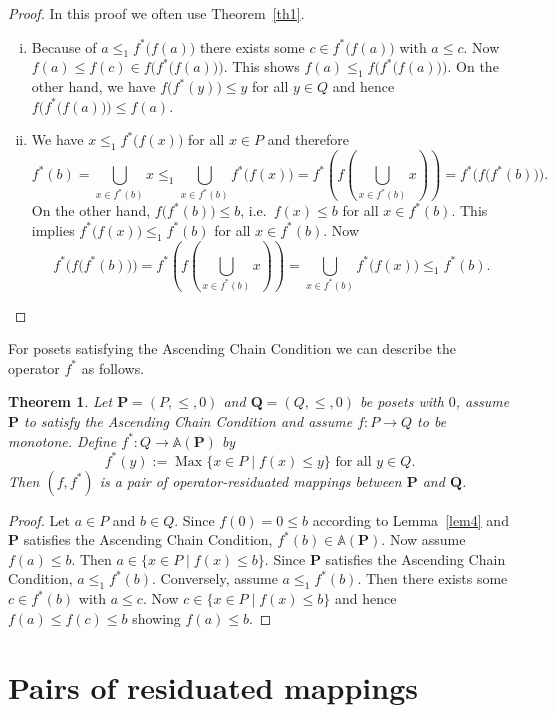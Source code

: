\documentclass[12pt]{article}
\DeclareMathOperator{\Max}{Max}
\newtheorem{theorem}{Theorem}[section]
\begin{document}
\begin{proof}
In this proof we often use Theorem~\ref{th1}.
\begin{enumerate}[(i)]
\item Because of $a\le_1f^*\big(f(a)\big)$ there exists some $c\in f^*\big(f(a)\big)$ with $a\le c$. Now $f(a)\le f(c)\in f\Big(f^*\big(f(a)\big)\Big)$. This shows $f(a)\le_1f\Big(f^*\big(f(a)\big)\Big)$. On the other hand, we have $f\big(f^*(y)\big)\le y$ for all $y\in Q$ and hence $f\Big(f^*\big(f(a)\big)\Big)\le f(a)$.
\item We have $x\le_1f^*\big(f(x)\big)$ for all $x\in P$ and therefore
\[
f^*(b)=\bigcup_{x\in f^*(b)}x\le_1\bigcup_{x\in f^*(b)}f^*\big(f(x)\big)=f^*(f\left(\bigcup_{x\in f^*(b)}x\right))=f^*\Big(f\big(f^*(b)\big)\Big).
\]
On the other hand, $f\big(f^*(b)\big)\le b$, i.e.\ $f(x)\le b$ for all $x\in f^*(b)$. This implies $f^*\big(f(x)\big)\le_1f^*(b)$ for all $x\in f^*(b)$. Now
\[
f^*\Big(f\big(f^*(b)\big)\Big)=f^*(f\left(\bigcup_{x\in f^*(b)}x\right))=\bigcup_{x\in f^*(b)}f^*\big(f(x)\big)\le_1f^*(b).
\]
\end{enumerate}	
\end{proof}

For posets satisfying the Ascending Chain Condition we can describe the operator $f^*$ as follows.

\begin{theorem}\label{th4}
Let $\mathbf P=(P,\le,0)$ and $\mathbf Q=(Q,\le,0)$ be posets with $0$, assume $\mathbf P$ to satisfy the Ascending Chain Condition and assume $f\colon P\to Q$ to be monotone. Define $f^*\colon Q\to\mathbb A(\mathbf P)$ by
\[
f^*(y):=\Max\{x\in P\mid f(x)\le y\}\text{ for all }y\in Q.\tag{2}
\]
Then $(f,f^*)$ is a pair of operator-residuated mappings between $\mathbf P$ and $\mathbf Q$.
\end{theorem}

\begin{proof}
Let $a\in P$ and $b\in Q$. Since $f(0)=0\le b$ according to Lemma~\ref{lem4} and $\mathbf P$ satisfies the Ascending Chain Condition, $f^*(b)\in\mathbb A(\mathbf P)$. Now assume $f(a)\le b$. Then $a\in\{x\in P\mid f(x)\le b\}$. Since $\mathbf P$ satisfies the Ascending Chain Condition, $a\le_1f^*(b)$. Conversely, assume $a\le_1f^*(b)$. Then there exists some $c\in f^*(b)$ with $a\le c$. Now $c\in\{x\in P\mid f(x)\le b\}$ and hence $f(a)\le f(c)\le b$ showing $f(a)\le b$.
\end{proof}

\section{Pairs of residuated mappings}
\end{document}
